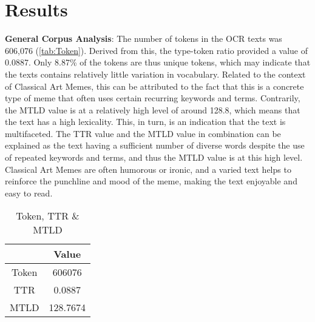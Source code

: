 \documentclass[11pt,a4paper]{article}
\begin{document}
 \section{Results}
 \textbf{General Corpus Analysis}:
 The number of tokens in the OCR texts was 606,076 (\autoref{tab:Token}). Derived from this, the type-token ratio provided a value of 0.0887. Only 8.87\% of the tokens are thus unique tokens, which may indicate that the texts contains relatively little variation in vocabulary. Related to the context of Classical Art Memes, this can be attributed to the fact that this is a concrete type of meme that often uses certain recurring keywords and terms. Contrarily, the MTLD value is at a relatively high level of around 128.8, which means that the text has a high lexicality. This, in turn, is an indication that the text is multifaceted. The TTR value and the MTLD value in combination can be explained as the text having a sufficient number of diverse words despite the use of repeated keywords and terms, and thus the MTLD value is at this high level. Classical Art Memes are often humorous or ironic, and a varied text helps to reinforce the punchline and mood of the meme, making the text enjoyable and easy to read.
 
\begin{table}[h]
  \centering
  \begin{tabular}{|c|c|}
   \hline
     & Value \\
    \hline
    \rowcolor[gray]{0.9} Token & 606076 \\
    \hline
    TTR & 0.0887 \\
    \hline
    \rowcolor[gray]{0.9} MTLD & 128.7674 \\
    \hline
  \end{tabular}
  \caption{Token, TTR \& MTLD}
  \label{tab:Token}
\end{table}
\end{document}
